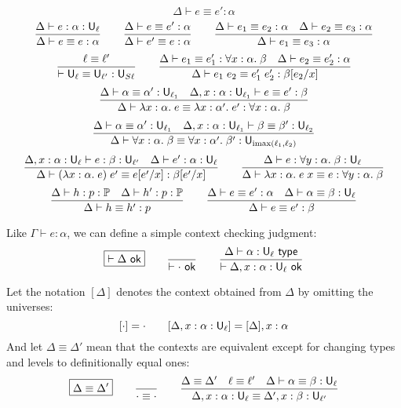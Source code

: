 $$\boxed{\Delta\vdash e\equiv e':\alpha}$$
$$\frac{\Delta\vdash e:\alpha:\U_\ell}{\Delta\vdash e\equiv e:\alpha}\qquad
\frac{\Delta\vdash e\equiv e':\alpha}{\Delta\vdash e'\equiv e:\alpha}\qquad
\frac{\Delta\vdash e_1\equiv e_2:\alpha\quad\Delta\vdash e_2\equiv e_3:\alpha}{\Delta\vdash e_1\equiv e_3:\alpha}$$
$$\frac{\ell\equiv\ell'}{\vdash \U_\ell\equiv\U_{\ell'}:\U_{S\ell}}\qquad
\frac{\Delta\vdash e_1\equiv e'_1:\forall x:\alpha.\;\beta\quad \Delta\vdash e_2\equiv e'_2:\alpha}{\Delta\vdash e_1\;e_2\equiv e'_1\;e'_2:\beta[e_2/x]}$$
$$\frac{\Delta\vdash\alpha\equiv \alpha':\U_{\ell_1}\quad \Delta,x:\alpha:\U_{\ell_1}\vdash e\equiv e':\beta}{\Delta\vdash\lambda x:\alpha.\;e\equiv \lambda x:\alpha'.\;e':\forall x:\alpha.\;\beta}$$
$$\frac{\Delta\vdash \alpha\equiv \alpha':\U_{\ell_1}\quad \Delta,x:\alpha:\U_{\ell_1}\vdash \beta\equiv \beta':\U_{\ell_2}}{\Delta\vdash \forall x:\alpha.\;\beta\equiv \forall x:\alpha'.\;\beta':\U_{\imax(\ell_1,\ell_2)}}$$
$$\frac{\Delta,x:\alpha:\U_\ell\vdash e:\beta:\U_{\ell'}\quad\Delta\vdash e':\alpha:\U_\ell}{\Delta\vdash (\lambda x:\alpha.\;e)\;e'\equiv e[e'/x]:\beta[e'/x]}\qquad
\frac{\Delta\vdash e:\forall y:\alpha.\;\beta:\U_\ell}{\Delta\vdash \lambda x:\alpha.\;e\;x\equiv e:\forall y:\alpha.\;\beta}$$
$$\frac{\Delta\vdash h:p:\P\quad \Delta\vdash h':p:\P}{\Delta \vdash h\equiv h':p}\qquad
\frac{\Delta\vdash e\equiv e':\alpha\quad \Delta\vdash\alpha\equiv\beta:\U_\ell}{\Delta\vdash e\equiv e':\beta}$$

Like $\Gamma\vdash e:\alpha$, we can define a simple context checking judgment:
$$\boxed{\vdash\Delta\ok}\qquad
\frac{}{\vdash\cdot\ok}\qquad
\frac{\Delta\vdash\alpha:\U_\ell\type}{\vdash\Delta,x:\alpha:\U_\ell\ok}$$

Let the notation $[\Delta]$ denotes the context obtained from $\Delta$ by omitting the universes:
$$[\cdot]=\cdot\qquad
[\Delta,x:\alpha:\U_\ell]=[\Delta],x:\alpha$$
And let $\Delta\equiv\Delta'$ mean that the contexts are equivalent except for changing types and levels to definitionally equal ones:
$$\boxed{\Delta\equiv\Delta'}\qquad\frac{}{\cdot\equiv\cdot}\qquad
\frac{\Delta\equiv\Delta'\quad\ell\equiv\ell'\quad\Delta\vdash\alpha\equiv\beta:\U_\ell}{\Delta,x:\alpha:\U_\ell\equiv\Delta',x:\beta:\U_{\ell'}}$$

